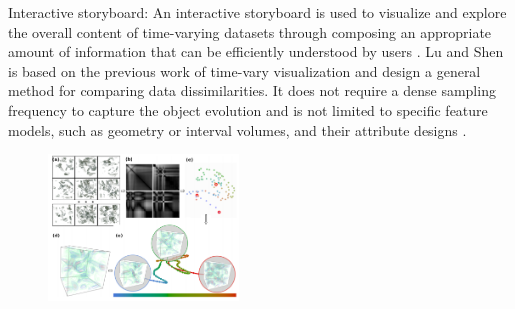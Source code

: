 \documentclass{egpubl}
\begin{document}
Interactive storyboard: An interactive storyboard is used to visualize and explore the overall content of time-varying datasets through composing an appropriate amount of information that can be efficiently understood by users \cite{lu2008interactive}. 
Lu and Shen is based on the previous work of time-vary visualization \cite{hansen2011visualization} and design a general method for comparing data dissimilarities. It does not require a dense sampling frequency to capture the object evolution and is not limited to specific feature models, such as geometry or interval volumes, and their attribute designs \cite{lu2008interactive}. 

\begin{figure}
\includegraphics[width=0.45\textwidth]{./images/lu2008}
\label{lu2008}
\end{figure}
\end{document}
